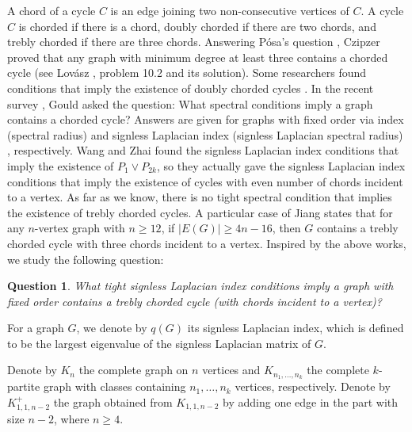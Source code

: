 \documentclass[12pt]{article}
\newtheorem {question}{Question}[section]
\begin{document}
A chord of a cycle
$C$ is an edge joining two non-consecutive vertices of $C$.
A cycle $C$ is chorded if there is a chord,  doubly chorded if there are two chords, and
trebly chorded if there are three chords.
Answering P\'{o}sa's
question  \cite{Po}, %
Czipzer \cite{Cz} proved
that any graph with minimum degree at least three contains a chorded cycle  (see Lov\'{a}sz  \cite{Lov}, problem 10.2 and its solution).
Some researchers found  conditions that imply the
existence of doubly chorded cycles \cite{QZ, CFG,SV,GHH,W97,GLW}. In  the recent survey \cite{Gou},
Gould asked the question: What spectral conditions imply a graph contains a chorded cycle?
Answers are given for graphs with fixed order via index (spectral radius) \cite{ZHW} and signless Laplacian index (signless Laplacian spectral radius) \cite{XZ}, respectively.
Wang and Zhai \cite{WZ} found the signless Laplacian index conditions that imply the existence of $P_1\vee P_{2k}$, so they actually gave the signless Laplacian index conditions that imply the existence of cycles with even number of chords  incident to a vertex.
As far as we know, there is no tight spectral condition that  implies the existence of trebly chorded cycles.
A particular case of Jiang \cite{Ji} states that for any $n$-vertex graph with $n\ge 12$, if $|E(G)|\ge 4n-16$, then $G$ contains  a trebly chorded cycle  with three chords incident to a vertex.
Inspired by the above works,
we study the following question:

\begin{question} \label{Qu}
What tight signless Laplacian index conditions imply a graph with fixed order contains a trebly chorded cycle (with chords incident to a vertex)?
\end{question}



For a graph $G$, we denote by $q(G)$ its signless Laplacian index, which is defined to be the largest eigenvalue of the signless Laplacian matrix of $G$.


Denote by $K_n$ the complete graph on $n$ vertices and $K_{n_1,\dots, n_k}$ the complete $k$-partite graph with classes containing $n_1,\dots, n_k$ vertices, respectively.
Denote by $K_{1,1,n-2}^+$ the graph obtained from $K_{1,1,n-2}$ by adding one edge in the part with size $n-2$, where $n\ge 4$.
\end{document}
